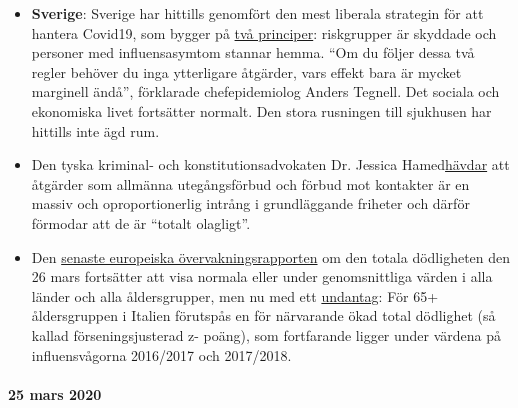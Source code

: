 \begin{itemize}
\tightlist
\item
  \textbf{Sverige}: Sverige har hittills genomfört den mest liberala
  strategin för att hantera Covid19, som bygger på
  \href{https://www.zeit.de/politik/ausland/2020-03/coronavirus-schweden-stockholm-oeffentliches-leben/komplettansicht}{två
  principer}: riskgrupper är skyddade och personer med influensasymtom
  stannar hemma. ``Om du följer dessa två regler behöver du inga
  ytterligare åtgärder, vars effekt bara är mycket marginell ändå'',
  förklarade chefepidemiolog Anders Tegnell. Det sociala och ekonomiska
  livet fortsätter normalt. Den stora rusningen till sjukhusen har
  hittills inte ägd rum.
\item
  Den tyska kriminal- och konstitutionsadvokaten Dr. Jessica
  Hamed\href{https://www.fr.de/politik/coronakrise-deutschland-sind-kontaktsperren-ausgangsbeschraenkungen-rechtswidrig-13611821.html}{hävdar}
  att åtgärder som allmänna utegångsförbud och förbud mot kontakter är
  en massiv och oproportionerlig intrång i grundläggande friheter och
  därför förmodar att de är ``totalt olagligt''.
\item
  Den \href{https://www.euromomo.eu/index.html}{senaste europeiska
  övervakningsrapporten} om den totala dödligheten den 26 mars
  fortsätter att visa normala eller under genomsnittliga värden i alla
  länder och alla åldersgrupper, men nu med ett
  \href{https://www.euromomo.eu/outputs/zscore_country65.html}{undantag}:
  För 65+ åldersgruppen i Italien förutspås en för närvarande ökad total
  dödlighet (så kallad förseningsjusterad z- poäng), som fortfarande
  ligger under värdena på influensvågorna 2016/2017 och 2017/2018.
\end{itemize}

\hypertarget{25-mars-2020}{%
\paragraph{25 mars 2020}\label{25-mars-2020}}

